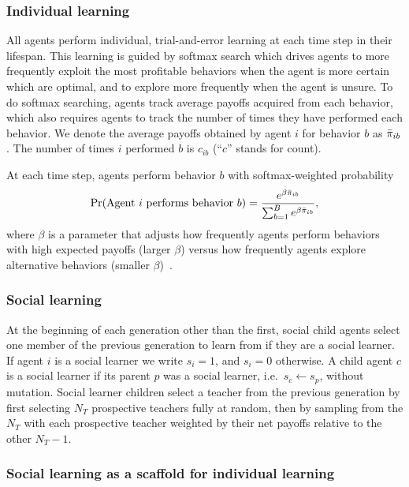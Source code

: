 \documentclass[letterpaper,11.5pt]{scrartcl}
\begin{document}
\subsubsection{Individual learning}

All agents perform individual, trial-and-error learning at each time step in
their lifespan.  This learning is guided by softmax search which
drives agents to more frequently exploit the most profitable behaviors when the
agent is more certain which are optimal, and to explore more frequently when the
agent is unsure.  To do softmax searching, agents track average payoffs acquired
from each behavior, which also requires agents to track the number of times they
have performed each behavior.  We denote the average payoffs obtained by agent $i$
for behavior $b$ as $\bar\pi_{ib}$. The number of times $i$ performed $b$ is $c_{ib}$
(``$c$'' stands for count). 

At each time step, agents perform behavior $b$ 
with softmax-weighted probability
\begin{equation}
  \Pr(\text{Agent $i$ performs behavior $b$}) = 
    \frac{e^{\beta \bar\pi_{ib}}}{\sum_{b=1}^B e^{\beta \bar\pi_{ib}}},
\end{equation}
\noindent
where $\beta$ is a parameter that adjusts how frequently agents perform 
behaviors with high expected payoffs (larger $\beta$) versus how frequently
agents explore alternative behaviors (smaller $\beta$)~\cite{McElreath2005}. 


\subsubsection{Social learning}

At the beginning of each generation other than the first, social child agents select
one member of the previous generation to learn from if they are a social learner.
If agent $i$ is a social learner we write $s_i = 1$, and $s_i = 0$ otherwise.
A child agent $c$ is a social learner if its parent $p$ was a social learner,
i.e.\ $s_c \leftarrow s_p$, without mutation. 
Social learner children select a teacher from 
the previous generation by first selecting $N_T$ prospective teachers fully
at random, then by sampling from the $N_T$ with each prospective teacher weighted
by their net payoffs relative to the other $N_T - 1$.


\subsubsection{Social learning as a scaffold for individual learning}
\end{document}
